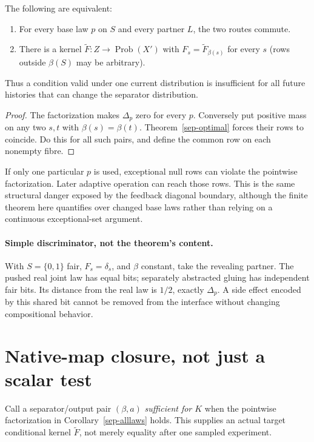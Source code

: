 \documentclass[11pt]{article}
\begin{document}
\begin{corollary}\label{sep-alllaws}
The following are equivalent:
\begin{enumerate}
\item For every base law $p$ on $S$ and every partner $L$, the two routes commute.
\item There is a kernel $\widetilde F:Z\to\operatorname{Prob}(X')$ with $F_s=\widetilde F_{\beta(s)}$ for every $s$ (rows outside $\beta(S)$ may be arbitrary).
\end{enumerate}
Thus a condition valid under one current distribution is insufficient for all future histories that can change the separator distribution.
\end{corollary}
\begin{proof}
The factorization makes $\Delta_p$ zero for every $p$. Conversely put positive mass on any two $s,t$ with $\beta(s)=\beta(t)$. Theorem~\ref{sep-optimal} forces their rows to coincide. Do this for all such pairs, and define the common row on each nonempty fibre.
\end{proof}
If only one particular $p$ is used, exceptional null rows can violate the pointwise factorization. Later adaptive operation can reach those rows. This is the same structural danger exposed by the feedback diagonal boundary, although the finite theorem here quantifies over changed base laws rather than relying on a continuous exceptional-set argument.

\paragraph{Simple discriminator, not the theorem's content.} With $S=\{0,1\}$ fair, $F_s=\delta_s$, and $\beta$ constant, take the revealing partner. The pushed real joint law has equal bits; separately abstracted gluing has independent fair bits. Its distance from the real law is $1/2$, exactly $\Delta_p$. A side effect encoded by this shared bit cannot be removed from the interface without changing compositional behavior.

\section{Native-map closure, not just a scalar test}
Call a separator/output pair $(\beta,a)$ \emph{sufficient for $K$} when the pointwise factorization in Corollary~\ref{sep-alllaws} holds. This supplies an actual target conditional kernel $\widetilde F$, not merely equality after one sampled experiment.
\end{document}
